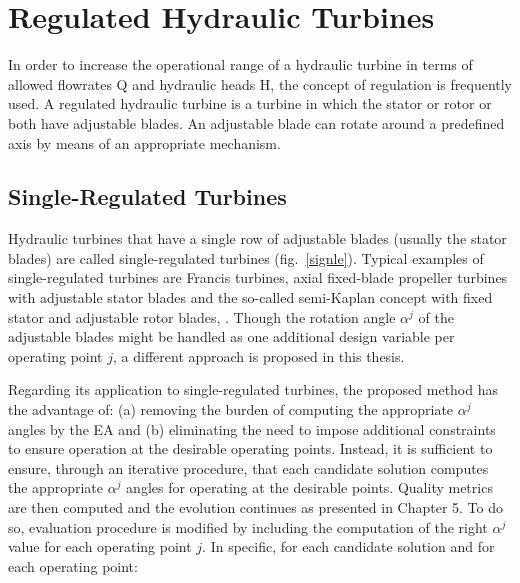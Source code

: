

\ifpdf
    \graphicspath{{8/figures/PNG/}{8/figures/PDF/}{8/figures/}}
\else
    \graphicspath{{8/figures/EPS/}{8/figures/}}
\fi


\chapter{Regulated Hydraulic Turbines}

In order to increase the operational range of a hydraulic turbine in terms of allowed flowrates Q and hydraulic heads H, the concept of regulation is frequently used. A regulated hydraulic turbine is a turbine in which the stator or rotor or both have adjustable blades. An adjustable blade can rotate around a predefined axis by means of an appropriate mechanism. 


\section{Single-Regulated Turbines}
\label{single.regulated}

Hydraulic turbines that have a single row of adjustable blades (usually the stator blades) are called single-regulated turbines (fig.\ \ref{signle}). Typical examples of single-regulated turbines are Francis turbines, axial fixed-blade propeller turbines with adjustable stator blades and the so-called semi-Kaplan concept with fixed stator and adjustable rotor blades, \cite{papanto,drtina1999hydraulic}.  
Though the rotation angle $\alpha^j$ of the adjustable blades might be handled as one additional design variable per operating point $j$, a different approach is proposed in this thesis. 
                 

Regarding its application to single-regulated turbines, the proposed method has the advantage of: (a) removing the burden of computing the appropriate $\alpha^j$ angles by the EA and (b) eliminating the need to impose additional constraints to ensure operation at the desirable operating points. Instead, it is sufficient to ensure, through an iterative procedure,  that each candidate solution computes the appropriate $\alpha^j$ angles for operating at the desirable points. Quality metrics are then computed and the evolution continues as presented in Chapter 5.  To do so, evaluation procedure is modified by including the computation of the right $\alpha^j$ value for each operating point $j$. In specific, for each candidate solution and for each operating point: 

